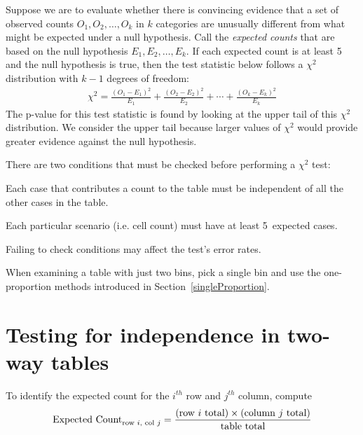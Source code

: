 \begin{termBox}{
Suppose we are to evaluate whether there is convincing evidence that a set of observed counts $O_1, O_2, \dots, O_k$ in $k$ categories are unusually different from what might be expected under a null hypothesis. Call the \emph{expected counts} that are based on the null hypothesis $E_1, E_2, \dots, E_k$. If each expected count is at least 5 and the null hypothesis is true, then the test statistic below follows a $\chi^2$ distribution with $k-1$ degrees of freedom:
\begin{align*}
\chi^2 = \frac{(O_1 - E_1)^2}{E_1} + \frac{(O_2 - E_2)^2}{E_2} + \cdots + \frac{(O_k - E_k)^2}{E_k}
\end{align*}
The p-value for this test statistic is found by looking at the upper tail of this $\chi^2$ distribution. We consider the upper tail because larger values of $\chi^2$ would provide greater evidence against the null hypothesis.}
\end{termBox}

\begin{tipBox}{
There are two conditions that must be checked before performing a $\chi^2$ test:\vspace{-1mm}
\begin{description}
\setlength{\itemsep}{0mm}
\item[Independence.] Each case that contributes a count to the table must be independent of all the other cases in the table.
\item[Sample size / distribution.] Each particular scenario (i.e. cell count) must have at least 5~expected cases.
\vspace{-1mm}
\end{description}
Failing to check conditions may affect the test's error rates.}
\end{tipBox}

When examining a table with just two bins, pick a single bin and use the one-proportion methods introduced in Section~\ref{singleProportion}.

\section{Testing for independence in two-way tables}
\label{twoWayTablesAndChiSquare}

\begin{termBox}{
To identify the expected count for the $i^{th}$ row and $j^{th}$ column, compute
\[
	\text{Expected Count}_{\text{row }i,\text{ col }j} = \frac{(\text{row $i$ total}) \times  (\text{column $j$ total})}{\text{table total}}\vspace{2mm}
\]
}
\end{termBox}


